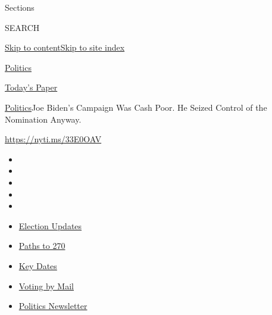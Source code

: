 Sections

SEARCH

\protect\hyperlink{site-content}{Skip to
content}\protect\hyperlink{site-index}{Skip to site index}

\href{https://www.nytimes3xbfgragh.onion/section/politics}{Politics}

\href{https://myaccount.nytimes3xbfgragh.onion/auth/login?response_type=cookie\&client_id=vi}{}

\href{https://www.nytimes3xbfgragh.onion/section/todayspaper}{Today's
Paper}

\href{/section/politics}{Politics}\textbar{}Joe Biden's Campaign Was
Cash Poor. He Seized Control of the Nomination Anyway.

\url{https://nyti.ms/33E0OAV}

\begin{itemize}
\item
\item
\item
\item
\item
\end{itemize}

\begin{itemize}
\item
  \href{https://www.nytimes3xbfgragh.onion/live/2020/09/11/us/trump-vs-biden?action=click\&pgtype=Article\&state=default\&region=TOP_BANNER\&context=storylines_menu}{Election
  Updates}
\item
  \href{https://www.nytimes3xbfgragh.onion/interactive/2020/us/elections/election-states-biden-trump.html?action=click\&pgtype=Article\&state=default\&region=TOP_BANNER\&context=storylines_menu}{Paths
  to 270}
\item
  \href{https://www.nytimes3xbfgragh.onion/interactive/2019/us/elections/2020-presidential-election-calendar.html?action=click\&pgtype=Article\&state=default\&region=TOP_BANNER\&context=storylines_menu}{Key
  Dates}
\item
  \href{https://www.nytimes3xbfgragh.onion/interactive/2020/08/31/us/politics/vote-by-mail-deadlines.html?action=click\&pgtype=Article\&state=default\&region=TOP_BANNER\&context=storylines_menu}{Voting
  by Mail}
\item
  \href{https://www.nytimes3xbfgragh.onion/newsletters/politics?action=click\&pgtype=Article\&state=default\&region=TOP_BANNER\&context=storylines_menu}{Politics
  Newsletter}
\end{itemize}

